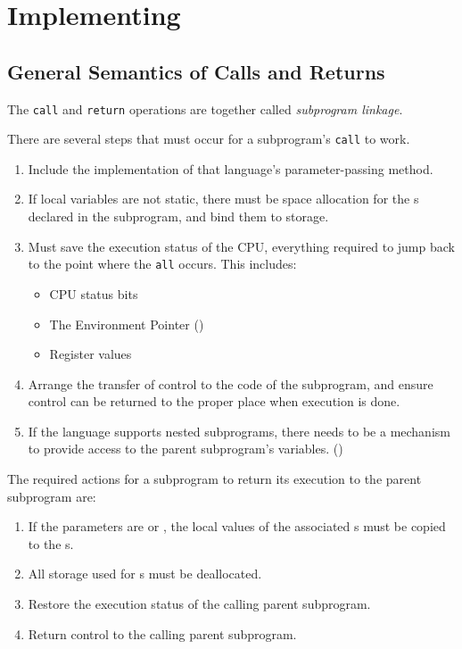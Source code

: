 \section{Implementing }\label{sec:Implementing_Subprograms}
\subsection{General Semantics of Calls and Returns}\label{subsec:Semantics_of_Calls_and_Returns}
\begin{definition}\label{def:Subprogram_Linkage}
  The \texttt{call} and \texttt{return} operations are together called \emph{subprogram linkage}.
\end{definition}

There are several steps that must occur for a subprogram's \texttt{call} to work.
\begin{enumerate}[noitemsep]
\item Include the implementation of that language's parameter-passing method.
\item If local variables are not static, there must be space allocation for the s declared in the subprogram, and bind them to storage.
\item Must save the execution status of the CPU, everything required to jump back to the point where the \texttt{all} occurs. This includes:
  \begin{itemize}[noitemsep]
  \item CPU status bits
  \item The Environment Pointer ()
  \item Register values
  \end{itemize}
\item Arrange the transfer of control to the code of the subprogram, and ensure control can be returned to the proper place when execution is done.
\item If the language supports nested subprograms, there needs to be a mechanism to provide access to the parent subprogram's variables. ()
\end{enumerate}

The required actions for a subprogram to return its execution to the parent subprogram are:
\begin{enumerate}[noitemsep]
\item If the parameters are  or , the local values of the associated s must be copied to the s.
\item All storage used for s must be deallocated.
\item Restore the execution status of the calling parent subprogram.
\item Return control to the calling parent subprogram.
\end{enumerate}


